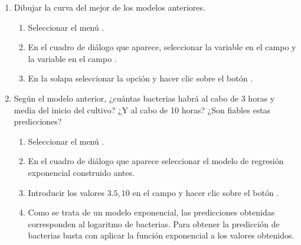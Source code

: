\begin{enumerate}[leftmargin=*]
\begin{enumerate}
\item Dibujar la curva del mejor de los modelos anteriores.
\begin{indicacion}
\begin{enumerate}
\item Seleccionar el menú .
\item En el cuadro de diálogo que aparece, seleccionar la variable  en el campo 
y la variable  en el campo .
\item En la solapa  seleccionar la opción  y hacer clic sobre el botón .
\end{enumerate}
\end{indicacion}

\item Según el modelo anterior, ¿cuántas bacterias habrá al cabo de 3 horas y media del inicio del cultivo? 
¿Y al cabo de 10 horas? 
¿Son fiables estas predicciones?
\begin{indicacion}
\begin{enumerate}
\item Seleccionar el menú .
\item En el cuadro de diálogo que aparece seleccionar el modelo de regresión exponencial construido antes.
\item Introducir los valores $3.5, 10$ en el campo  y hacer clic sobre el botón .
\item Como se trata de un modelo exponencial, las predicciones obtenidas corresponden al logaritmo de bacterias. 
Para obtener la predicción de bacterias basta con aplicar la función exponencial a los valores obtenidos.
\end{enumerate}
\end{indicacion}


\end{enumerate}
\end{enumerate}
